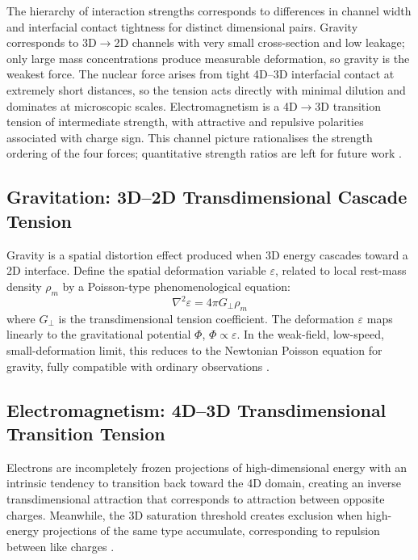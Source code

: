 \documentclass[12pt,a4paper]{article}
\begin{document}
The hierarchy of interaction strengths corresponds to differences in channel width and interfacial contact tightness for distinct dimensional pairs. Gravity corresponds to 3D$\to$2D channels with very small cross-section and low leakage; only large mass concentrations produce measurable deformation, so gravity is the weakest force. The nuclear force arises from tight 4D–3D interfacial contact at extremely short distances, so the tension acts directly with minimal dilution and dominates at microscopic scales. Electromagnetism is a 4D$\to$3D transition tension of intermediate strength, with attractive and repulsive polarities associated with charge sign. This channel picture rationalises the strength ordering of the four forces; quantitative strength ratios are left for future work \cite{griffiths, perkins}.

\subsection{Gravitation: 3D–2D Transdimensional Cascade Tension}
Gravity is a spatial distortion effect produced when 3D energy cascades toward a 2D interface. Define the spatial deformation variable $\varepsilon$, related to local rest-mass density $\rho_m$ by a Poisson-type phenomenological equation:
\begin{equation}
\nabla^2 \varepsilon = 4\pi G_\perp \rho_m
\end{equation}
where $G_\perp$ is the transdimensional tension coefficient. The deformation $\varepsilon$ maps linearly to the gravitational potential $\Phi$, $\Phi \propto \varepsilon$. In the weak-field, low-speed, small-deformation limit, this reduces to the Newtonian Poisson equation for gravity, fully compatible with ordinary observations \cite{chandrasekhar1965}.

\subsection{Electromagnetism: 4D–3D Transdimensional Transition Tension}
Electrons are incompletely frozen projections of high-dimensional energy with an intrinsic tendency to transition back toward the 4D domain, creating an inverse transdimensional attraction that corresponds to attraction between opposite charges. Meanwhile, the 3D saturation threshold creates exclusion when high-energy projections of the same type accumulate, corresponding to repulsion between like charges \cite{jackson1998}.
\end{document}
